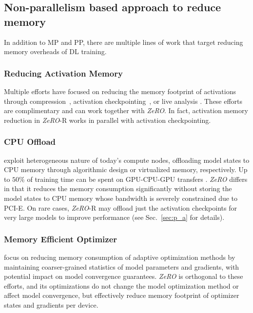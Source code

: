 \documentclass{article}
\newcommand{\name}{\emph{ZeRO}\xspace}
\begin{document}
\subsection{Non-parallelism based approach to reduce memory}
In addition to MP and PP, there are multiple lines of work that target reducing memory overheads of DL training. 
\subsubsection{Reducing Activation Memory}
Multiple efforts have focused on reducing the memory footprint of activations through compression~\cite{jain2018gist}, activation checkpointing~\cite{DBLP:journals/corr/ChenXZG16, Jain2019CheckmateBT}, or live analysis \cite{DBLP:journals/corr/abs-1801-04380}. These efforts are complimentary and can work together with \name. In fact, activation memory reduction in \name-R works in parallel with activation checkpointing. 
\subsubsection{CPU Offload}
\cite{layer2layer, 7783721} exploit heterogeneous nature of today's compute nodes, offloading model states to CPU memory through algorithmic design or virtualized memory, respectively. Up to $50\%$ of training time can be spent on GPU-CPU-GPU transfers \cite{layer2layer}. \name differs in that it reduces the memory consumption significantly without storing the model states to CPU memory whose bandwidth is severely constrained due to PCI-E. On rare cases, \name-R may offload just the activation checkpoints for very large models to improve performance (see Sec.~\ref{sec:p_a} for details). 
\subsubsection{Memory Efficient Optimizer}
\cite{DBLP:journals/corr/adafactor,Anil2019MemoryEfficientAO} focus on reducing memory consumption of adaptive optimization methods by maintaining coarser-grained statistics of model parameters and gradients, with potential impact on model convergence guarantees. \name is orthogonal to these efforts, and its optimizations 
do not change the model optimization method or affect model convergence, but effectively reduce memory footprint of optimizer states and gradients per device.
\end{document}
